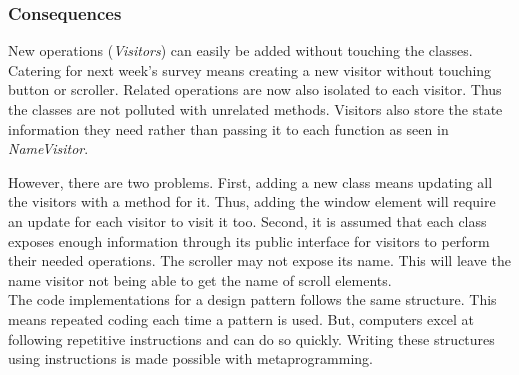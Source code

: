 \subsubsection{Consequences}
New operations (\textit{Visitors}) can easily be added without touching the classes.
Catering for next week's survey means creating a new visitor without touching button or scroller.
Related operations are now also isolated to each visitor.
Thus the classes are not polluted with unrelated methods.
Visitors also store the state information they need rather than passing it to each function as seen in \textit{NameVisitor}.

However, there are two problems.
First, adding a new class means updating all the visitors with a method for it.
Thus, adding the window element will require an update for each visitor to visit it too.
Second, it is assumed that each class exposes enough information through its public interface for visitors to perform their needed operations.
The scroller may not expose its name.
This will leave the name visitor not being able to get the name of scroll elements.\\

The code implementations for a design pattern follows the same structure.
This means repeated coding each time a pattern is used.
But, computers excel at following repetitive instructions and can do so quickly.
Writing these structures using instructions is made possible with metaprogramming.